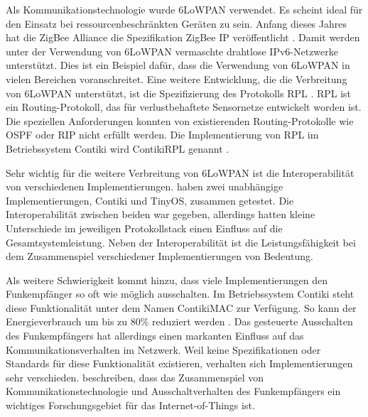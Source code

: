 
Als Kommunikationstechnologie wurde 6LoWPAN verwendet. Es scheint ideal für den Einsatz bei ressourcenbeschränkten Geräten zu sein. Anfang dieses Jahres hat die ZigBee Alliance die Spezifikation ZigBee IP veröffentlicht \citep{zigbee-ip}. Damit werden unter der Verwendung von 6LoWPAN vermaschte drahtlose IPv6-Netzwerke unterstützt. Dies ist ein Beispiel dafür, dass die Verwendung von 6LoWPAN in vielen Bereichen voranschreitet. Eine weitere Entwicklung, die die Verbreitung von 6LoWPAN unterstützt, ist die Spezifizierung des Protokolls RPL \citep{RFC6550}. RPL ist ein Routing-Protokoll, das für verlustbehaftete Sensornetze entwickelt worden ist. Die speziellen Anforderungen konnten von existierenden Routing-Protokolle wie OSPF oder RIP nicht erfüllt werden. Die Implementierung von RPL im Betriebssystem Contiki wird ContikiRPL genannt \citep{tsiftes10rpl}.

Sehr wichtig für die weitere Verbreitung von 6LoWPAN ist die Interoperabilität von verschiedenen Implementierungen. \textcite{ko11beyond} haben zwei unabhängige Implementierungen, Contiki und TinyOS, zusammen getestet. Die Interoperabilität zwischen beiden war gegeben, allerdings hatten kleine Unterschiede im jeweiligen Protokollstack einen Einfluss auf die Gesamtsystemleistung. Neben der Interoperabilität ist die Leistungsfähigkeit bei dem Zusammenspiel verschiedener Implementierungen von Bedeutung.

Als weitere Schwierigkeit kommt hinzu, dass viele Implementierungen den Funkempfänger so oft wie möglich ausschalten. Im Betriebssystem Contiki steht diese Funktionalität unter dem Namen ContikiMAC zur Verfügung. So kann der Energieverbrauch um bis zu 80\% reduziert werden \citep{dunkels11contikimac}. Das gesteuerte Ausschalten des Funkempfängers hat allerdings einen markanten Einfluss auf das Kommunikationsverhalten im Netzwerk. Weil keine Spezifikationen oder Standards für diese Funktionalität existieren, verhalten sich Implementierungen sehr verschieden. \textcite{dunkels11adhoc} beschreiben, dass das Zusammenspiel von Kommunikationstechnologie und Ausschaltverhalten des Funkempfängers ein wichtiges Forschungsgebiet für das Internet-of-Things ist.

